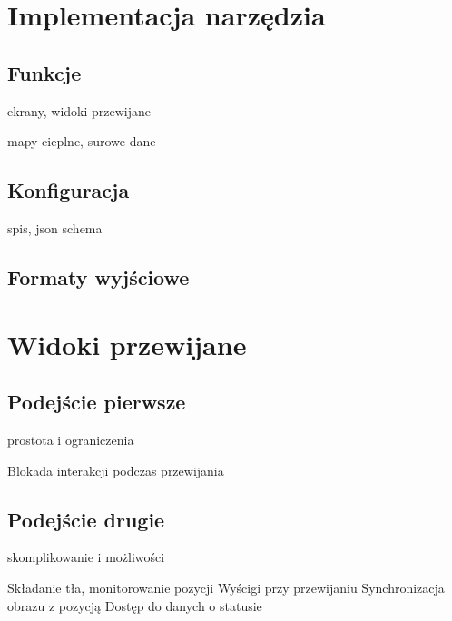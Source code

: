 \section{Implementacja narzędzia}

\subsection{Funkcje}
ekrany, widoki przewijane

mapy cieplne, surowe dane

\subsection{Konfiguracja}
spis, json schema

\subsection{Formaty wyjściowe}

\section{Widoki przewijane}

\subsection{Podejście pierwsze}
prostota i ograniczenia

Blokada interakcji podczas przewijania

\subsection{Podejście drugie}
skomplikowanie i możliwości

Składanie tła, monitorowanie pozycji
Wyścigi przy przewijaniu
Synchronizacja obrazu z pozycją
Dostęp do danych o statusie
